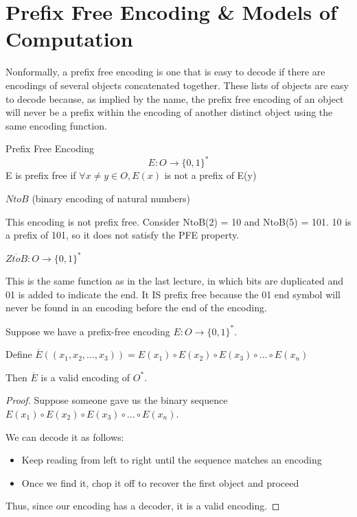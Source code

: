 \chapter{Prefix Free Encoding \& Models of Computation}

Nonformally, a prefix free encoding is one that is easy to decode if there are encodings of several objects concatenated together. These lists of objects are easy to decode because, as implied by the name, the prefix free encoding of an object will never be a prefix within the encoding of another distinct object using the same encoding function. 

\begin{definition}
    Prefix Free Encoding
    \[
        E: O \rightarrow \{0,1\}^*  
    \]
    E is prefix free if $\forall x \neq y \in O, E(x)$ is not a prefix of E(y)
\end{definition}

\begin{example}
    $NtoB$ (binary encoding of natural numbers)

    This encoding is not prefix free. Consider NtoB(2) = 10 and NtoB(5) = 101. 10 is a prefix of 101, so it does not satisfy the PFE property.
\end{example}

\begin{example}
    $\overline{ZtoB}: O \rightarrow \{0,1\}^*$
    
    This is the same function as in the last lecture, in which bits are duplicated and 01 is added to indicate the end. It IS prefix free because the 01 end symbol will never be found in an encoding before the end of the encoding. 
\end{example}

\begin{theorem}
    Suppose we have a prefix-free encoding $E: O \rightarrow \{0,1\}^*$.

    Define $\overline{E}((x_1, x_2, ..., x_3)) = E(x_1) \circ E(x_2) \circ E(x_3) \circ ... \circ E(x_n)$

    Then $\overline{E}$ is a valid encoding of $O^*$.
\end{theorem}

\begin{proof}
    Suppose someone gave us the binary sequence $E(x_1) \circ E(x_2) \circ E(x_3) \circ ... \circ E(x_n)$.

    We can decode it as follows:
    \begin{itemize}
        \item Keep reading from left to right until the sequence matches an encoding
        \item Once we find it, chop it off to recover the first object and proceed
    \end{itemize}

    Thus, since our encoding has a decoder, it is a valid encoding.
\end{proof}

